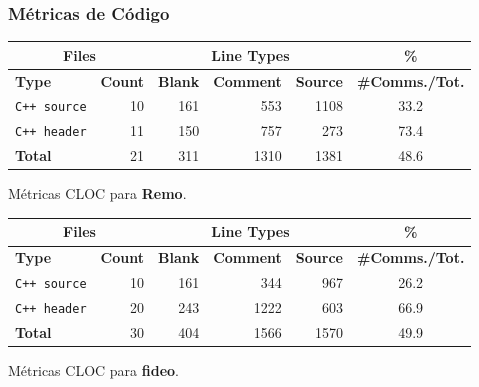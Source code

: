   \begin{frame}\frametitle{\textbf{Métricas de Código}}    
    \begin{table}[!htf]
    \begin{tabular}{|l|r|r|r|r|c|}
    \hline
    \multicolumn{2}{|c|}{Files} & \multicolumn{3}{|c|}{Line Types} & \hspace{0.2cm}\% \\
    \hline
    \textbf{Type} & \textbf{Count} & \textbf{Blank} & \textbf{Comment} & \textbf{Source} & \small{\textbf{\#Comms./Tot.}}\\
    \hline
    \texttt{C++ source} & 10 & 161 & 553 & 1108 & 33.2 \\
    \hline
    \texttt{C++ header} & 11 & 150 & 757 & 273 & 73.4 \\
    \hline
    \textbf{Total}      & 21 & 311 & 1310 & 1381 & 48.6 \\
    \hline
    \end{tabular}    
    \end{table}
    \hspace*{3.5cm}Métricas CLOC para \textbf{Remo}.

    \begin{table}[!htf]
    \begin{tabular}{|l|r|r|r|r|c|}
    \hline
    \multicolumn{2}{|c|}{Files} & \multicolumn{3}{|c|}{Line Types} & \hspace{0.2cm}\% \\
    \hline
    \textbf{Type} & \textbf{Count} & \textbf{Blank} & \textbf{Comment} & \textbf{Source} & \small{\textbf{\#Comms./Tot.}}\\
    \hline
    \texttt{C++ source} & 10   &    161  &     344   &    967 & 26.2 \\
    \hline
    \texttt{C++ header} & 20   &    243  &    1222   &    603 & 66.9 \\
    \hline
    \textbf{Total}      &  30  &     404 &     1566  &    1570 & 49.9 \\
    \hline
    \end{tabular}
    \end{table}
    \hspace*{3.5cm} Métricas CLOC para \textbf{fideo}.
  \end{frame}

